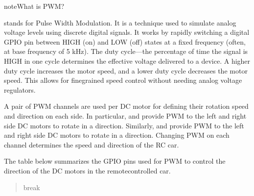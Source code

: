 \documentclass[letterpaper,10pt,english]{sphinxmanual}
\begin{document}
\begin{sphinxadmonition}{note}{What is PWM?}

\sphinxAtStartPar
{} stands for Pulse Width Modulation. It is a technique used to simulate analog voltage levels using discrete digital signals. It works by
rapidly switching a digital GPIO pin between HIGH (on) and LOW (off) states at a fixed frequency (often, at base frequency of 5 kHz).
The duty cycle—the percentage of time the signal is HIGH in one cycle determines the effective voltage delivered to a device.
A higher duty cycle increases the motor speed, and a lower duty cycle decreases the motor speed. This allows for fine\sphinxhyphen{}grained speed control
without needing analog voltage regulators.
\end{sphinxadmonition}

\sphinxAtStartPar
A pair of PWM channels are used per DC motor for defining their rotation speed and direction on each side.
In particular,  and  provide PWM to the left\sphinxhyphen{} and right\sphinxhyphen{} side DC motors to rotate in a  direction.
Similarly,  and  provide PWM to the left\sphinxhyphen{} and right\sphinxhyphen{} side DC motors to rotate in a  direction.
Changing PWM on each channel determines the speed and direction of the RC car.

\sphinxAtStartPar
The table below summarizes the GPIO pins used for PWM to control the direction of the DC motors in the remote\sphinxhyphen{}controlled car.
\begin{quote}\begin{description}
\sphinxAtStartPar
break

\end{description}\end{quote}
\end{document}
